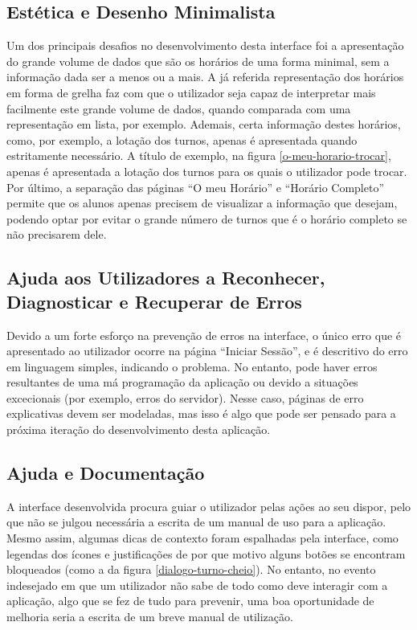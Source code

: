 \documentclass[12pt, a4paper]{article}
\begin{document}
\subsection{Estética e Desenho Minimalista}

Um dos principais desafios no desenvolvimento desta interface foi a apresentação do grande volume de
dados que são os horários de uma forma minimal, sem a informação dada ser a menos ou a mais. A já
referida representação dos horários em forma de grelha faz com que o utilizador seja capaz de
interpretar mais facilmente este grande volume de dados, quando comparada com uma representação em
lista, por exemplo. Ademais, certa informação destes horários, como, por exemplo, a lotação dos
turnos, apenas é apresentada quando estritamente necessário. A título de exemplo, na figura
\ref{o-meu-horario-trocar}, apenas é apresentada a lotação dos turnos para os quais o utilizador
pode trocar. Por último, a separação das páginas ``O meu Horário'' e ``Horário Completo'' permite
que os alunos apenas precisem de visualizar a informação que desejam, podendo optar por evitar o
grande número de turnos que é o horário completo se não precisarem dele.

\subsection{Ajuda aos Utilizadores a Reconhecer, Diagnosticar e Recuperar de Erros}

Devido a um forte esforço na prevenção de erros na interface, o único erro que é apresentado ao
utilizador ocorre na página ``Iniciar Sessão'', e é descritivo do erro em linguagem simples,
indicando o problema. No entanto, pode haver erros resultantes de uma má programação da aplicação
ou devido a situações excecionais (por exemplo, erros do servidor). Nesse caso, páginas de erro
explicativas devem ser modeladas, mas isso é algo que pode ser pensado para a próxima iteração do
desenvolvimento desta aplicação.

\subsection{Ajuda e Documentação}

A interface desenvolvida procura guiar o utilizador pelas ações ao seu dispor, pelo que não se
julgou necessária a escrita de um manual de uso para a aplicação. Mesmo assim, algumas dicas de
contexto foram espalhadas pela interface, como legendas dos ícones e justificações de por que motivo
alguns botões se encontram bloqueados (como a da figura \ref{dialogo-turno-cheio}). No entanto, no
evento indesejado em que um utilizador não sabe de todo como deve interagir com a aplicação, algo
que se fez de tudo para prevenir, uma boa oportunidade de melhoria seria a escrita de um breve
manual de utilização.
\end{document}
